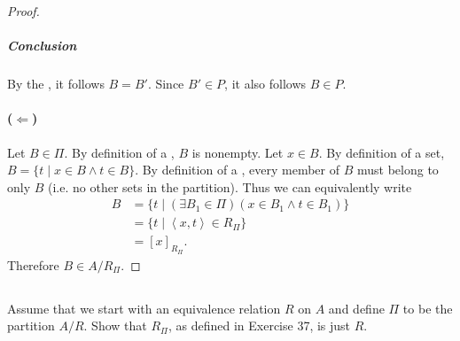 \documentclass{report}
\newcommand{\pair}[1]{\left< #1 \right>}
\begin{document}
\begin{proof}
    \subparagraph{Conclusion}%

      By the , it follows $B = B'$.
      Since $B' \in P$, it also follows $B \in P$.

  \paragraph{($\Leftarrow$)}%

    Let $B \in \Pi$.
    By definition of a , $B$ is nonempty.
    Let $x \in B$.
    By definition of a set, $B = \{t \mid x \in B \land t \in B\}$.
    By definition of a , every member of $B$ must belong
      to only $B$ (i.e. no other sets in the partition).
    Thus we can equivalently write
      \begin{align*}
        B
          & = \{t \mid (\exists B_1 \in \Pi)(x \in B_1 \land t \in B_1)\} \\
          & = \{ t \mid \pair{x, t} \in R_\Pi \} \\
          & = [x]_{R_\Pi}.
      \end{align*}
    Therefore $B \in A / R_{\Pi}$.

\end{proof}

\subsection{}%

Assume that we start with an equivalence relation $R$ on $A$ and define $\Pi$ to
  be the partition $A / R$.
Show that $R_\Pi$, as defined in Exercise 37, is just $R$.
\end{document}

